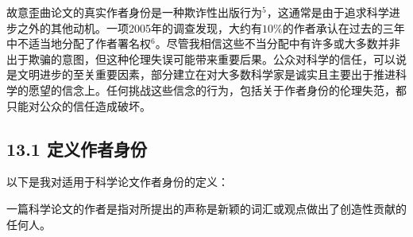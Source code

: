 故意歪曲论文的真实作者身份是一种欺诈性出版行为$^{5}$，这通常是由于追求科学进步之外的其他动机。一项2005年的调查发现，大约有$10 \%$的作者承认在过去的三年中不适当地分配了作者署名权${ }^{6}$。尽管我相信这些不当分配中有许多或大多数并非出于欺骗的意图，但这种伦理失误可能带来重要后果。公众对科学的信任，可以说是文明进步的至关重要因素，部分建立在对大多数科学家是诚实且主要出于推进科学的愿望的信念上。任何挑战这些信念的行为，包括关于作者身份的伦理失范，都只能对公众的信任造成破坏。

\subsection*{13.1 定义作者身份}
以下是我对适用于科学论文作者身份的定义：

一篇科学论文的作者是指对所提出的声称是新颖的词汇或观点做出了创造性贡献的任何人。

